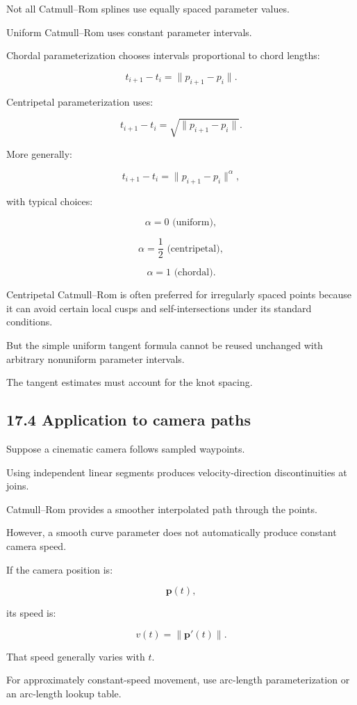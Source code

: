 Not all Catmull--Rom splines use equally spaced parameter values.

Uniform Catmull--Rom uses constant parameter intervals.

Chordal parameterization chooses intervals proportional to chord lengths:

\[ t_{i+1}-t_i=\|p_{i+1}-p_i\|. \]

Centripetal parameterization uses:

\[ \boxed{ t_{i+1}-t_i=\sqrt{\|p_{i+1}-p_i\|} }. \]

More generally:

\[ t_{i+1}-t_i= \|p_{i+1}-p_i\|^\alpha, \]

with typical choices:

\[ \alpha=0 \text{ (uniform)}, \]

\[ \alpha=\frac12 \text{ (centripetal)}, \]

\[ \alpha=1 \text{ (chordal)}. \]

Centripetal Catmull--Rom is often preferred for irregularly spaced points because it can avoid certain local cusps and self-intersections under its standard conditions.

But the simple uniform tangent formula cannot be reused unchanged with arbitrary nonuniform parameter intervals.

The tangent estimates must account for the knot spacing.

\subsection{17.4 Application to camera paths}\label{02-foundations-ii-ch028-application-to-camera-paths}

Suppose a cinematic camera follows sampled waypoints.

Using independent linear segments produces velocity-direction discontinuities at joins.

Catmull--Rom provides a smoother interpolated path through the points.

However, a smooth curve parameter does not automatically produce constant camera speed.

If the camera position is:

\[ \mathbf p(t), \]

its speed is:

\[ \boxed{ v(t)=\|\mathbf p'(t)\| }. \]

That speed generally varies with \(t\).

For approximately constant-speed movement, use arc-length parameterization or an arc-length lookup table.

